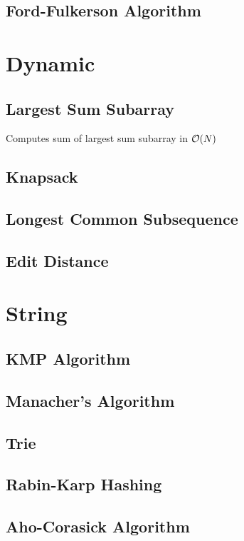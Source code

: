 \documentclass[landscape,8pt]{article}
\begin{document}
\begin{multicols}{2}
  \subsection{Ford-Fulkerson Algorithm}
\columnbreak
\section{Dynamic}
  \subsection{Largest Sum Subarray}
  Computes sum of largest sum subarray in $\order{N}$
  

  \subsection{Knapsack}

  \subsection{Longest Common Subsequence}
    
  \subsection{Edit Distance}

\section{String}
  \subsection{KMP Algorithm}

  \subsection{Manacher's Algorithm}

  \subsection{Trie}

  \subsection{Rabin-Karp Hashing}

  \subsection{Aho-Corasick Algorithm}
\columnbreak

\end{multicols}
\end{document}
